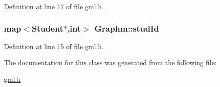 \-Definition at line 17 of file gml.\-h.

\hypertarget{classGraphm_a21845bc3fcd7390fecd156422d4c8d64}{
\subsubsection[{stud\-Id}]{\setlength{\rightskip}{0pt plus 5cm}map$<${\bf \-Student}$\ast$,int$>$ {\bf \-Graphm\-::stud\-Id}}}\label{classGraphm_a21845bc3fcd7390fecd156422d4c8d64}


\-Definition at line 15 of file gml.\-h.



\-The documentation for this class was generated from the following file\-:\begin{DoxyCompactItemize}
\item 
\hyperlink{gml_8h}{gml.\-h}\end{DoxyCompactItemize}
